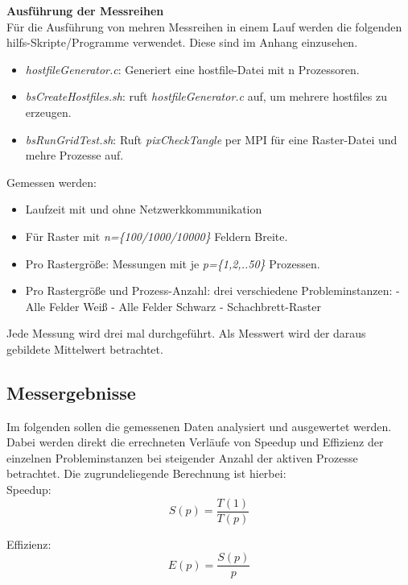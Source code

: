\documentclass[
10pt, %
a4paper, %
oneside, %
headinclude,footinclude, %
BCOR5mm, %
]{scrartcl}
\begin{document}
\textbf{Ausführung der Messreihen}\\ 
Für die Ausführung von mehren Messreihen in einem Lauf werden die folgenden hilfs-Skripte/Programme verwendet. Diese sind im Anhang einzusehen.
\begin{itemize}[noitemsep] %
	\item \textit{hostfileGenerator.c}: Generiert eine hostfile-Datei mit n Prozessoren.
	\item \textit{bsCreateHostfiles.sh}: ruft \textit{hostfileGenerator.c} auf, um mehrere  hostfiles zu erzeugen.
	\item \textit{bsRunGridTest.sh}: Ruft \textit{pixCheckTangle} per MPI für eine Raster-Datei und mehre Prozesse auf.
\end{itemize}

Gemessen werden:
\begin{itemize}[noitemsep] %
	\item Laufzeit mit und ohne Netzwerkkommunikation
	\item Für Raster mit \textit{n=\{100/1000/10000\}} Feldern Breite.
	\item Pro Rastergröße: Messungen mit je \textit{p=\{1,2,..50\}} Prozessen.
	\item Pro Rastergröße und Prozess-Anzahl: drei verschiedene Probleminstanzen: 
	\subitem - Alle Felder Weiß
	\subitem - Alle Felder Schwarz
	\subitem - Schachbrett-Raster
\end{itemize}

Jede Messung wird drei mal durchgeführt. Als Messwert wird der daraus gebildete Mittelwert betrachtet.

\subsection{Messergebnisse}

Im folgenden sollen die gemessenen Daten analysiert und ausgewertet werden. Dabei werden direkt die errechneten Verläufe von Speedup und Effizienz der einzelnen Probleminstanzen bei steigender Anzahl der aktiven Prozesse betrachtet. Die zugrundeliegende Berechnung ist hierbei:\\

Speedup:
\begin{equation}
S(p)=\frac{T(1)}{T(p)}
\end{equation}

Effizienz:
\begin{equation}
E(p)=\frac{S(p)}{p}
\end{equation}
\end{document}

